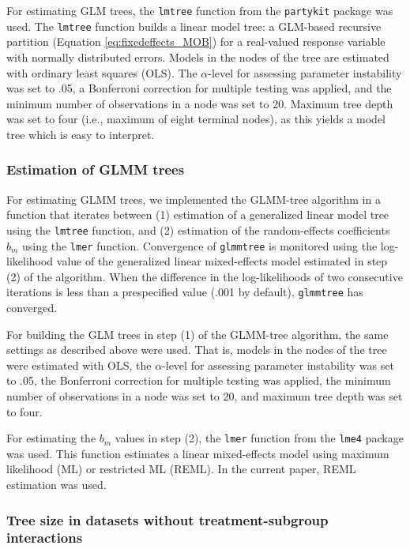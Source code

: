 \documentclass[nobf,doc]{apa}
\begin{document}
For estimating GLM trees, the \verb|lmtree| function from the \verb|partykit| package was used. The \verb|lmtree| function builds a linear model tree: a GLM-based recursive partition (Equation \ref{eq:fixedeffects_MOB}) for a real-valued response variable with normally distributed errors. Models in the nodes of the tree are estimated with ordinary least squares (OLS). The $\alpha$-level for assessing parameter instability was set to .05, a Bonferroni correction for multiple testing was applied, and the minimum number of observations in a node was set to 20. Maximum tree depth was set to four (i.e., maximum of eight terminal nodes), as this yields a model tree which is easy to interpret. 


\subsubsection{Estimation of GLMM trees}  

For estimating GLMM trees, we implemented the GLMM-tree algorithm in a function that iterates between (1) estimation of a generalized linear model tree using the \verb|lmtree| function, and (2) estimation of the random-effects coefficients $b_m$ using the \verb|lmer| function. Convergence of \verb|glmmtree| is monitored using the log-likelihood value of the generalized linear mixed-effects model estimated in step (2) of the algorithm. When the difference in the log-likelihoods of two consecutive iterations is less than a prespecified value (.001 by default), \verb|glmmtree| has converged. 

For building the GLM trees in step (1) of the GLMM-tree algorithm, the same settings as described above were used. That is, models in the nodes of the tree were estimated with OLS, the $\alpha$-level for assessing parameter instability was set to .05, the Bonferroni correction for multiple testing was applied, the minimum number of observations in a node was set to 20, and maximum tree depth was set to four.

For estimating the $b_m$ values in step (2), the \verb|lmer| function from the \verb|lme4| package was used. This function estimates a linear mixed-effects model using maximum likelihood (ML) or restricted ML (REML). In the current paper, REML estimation was used.





\subsubsection{Tree size in datasets without treatment-subgroup interactions}
\end{document}

